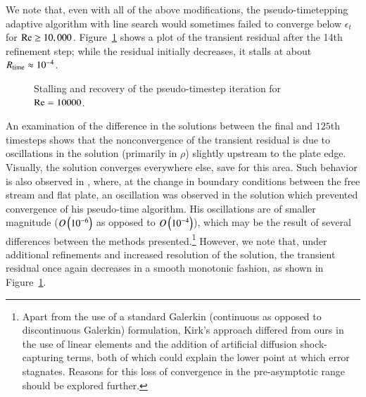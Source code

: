 We note that, even with all of the above modifications, the pseudo-timetepping adaptive algorithm with line search would sometimes failed to converge below $\epsilon_t$ for ${\rm Re} \geq 10,000$.  Figure~\ref{fig:nonconvergence} shows a plot of the transient residual after the 14th refinement step; while the residual initially decreases, it stalls at about $R_{\rm time} \approx 10^{-4}$.  
\begin{figure}
\centering
{}
\caption{Stalling and recovery of the pseudo-timestep iteration for $\Reyn = 10000$.}
\label{fig:nonconvergence}
\end{figure}
An examination of the difference in the solutions between the final and $125$th timesteps shows that the nonconvergence of the transient residual is due to oscillations in the solution (primarily in $\rho$) slightly upstream to the plate edge.  Visually, the solution converges everywhere else, save for this area.  Such behavior is also observed in \cite{BenKirk}, where, at the change in boundary conditions between the free stream and flat plate, an oscillation was observed in the solution which prevented convergence of his pseudo-time algorithm.  His oscillations are of smaller magnitude ($O\LRp{10^{-6}}$ as opposed to $O\LRp{10^{-4}}$), which may be the result of several differences between the methods presented.\footnote{Apart from the use of a standard Galerkin (continuous as opposed to discontinuous Galerkin) formulation, Kirk's approach differed from ours in the use of linear elements and the addition of artificial diffusion shock-capturing terms, both of which could explain the lower point at which error stagnates. Reasons for this loss of convergence in the pre-asymptotic range should be explored further.}  However, we note that, under additional refinements and increased resolution of the solution, the transient residual once again decreases in a smooth monotonic fashion, as shown in Figure~\ref{fig:nonconvergence}. 

